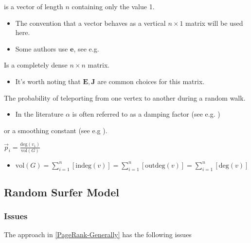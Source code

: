 \documentclass[11pt]{article}
\begin{document}
\begin{description}
\item[{\(\vec{1}\)}] is a vector of length \(n\) containing only the value 1.
\begin{itemize}
\item The convention that a vector behaves as a vertical \(n \times 1\) matrix will be used here.
\item Some authors use \(\mathbf{e}\), see e.g. \cite{langvilleGooglePageRankScience2012}
\end{itemize}
\item[{\(\mathbf{J} = \vec{1}\cdot \vec{1}^{\mathrm{T}} \iff \mathbf{J}_{i,j} = 1\)}] Is a completely dense \(n \times n\) matrix.
\begin{itemize}
\item It's worth noting that \(\mathbf{E}, \mathbf{J}\) are common choices for this matrix.
\end{itemize}
\item[{\(\alpha\)}] The probability of teleporting from one vertex to another during a random walk.
\begin{itemize}
\item In the literature \(\alpha\) is often referred to as a damping factor (see e.g.  \cite{berkhoutRankingNodesGeneral2018a,brinkmeierPageRankRevisited2006a,fuDampingFactorGoogle2006,kamvarAdaptiveMethodsComputation2004b,bianchiniPageRank2005})
\end{itemize}
or a smoothing constant (see e.g \cite{koppelMeasuringDirectIndirect2014}).
\item \(\vec{p}_{i} = \frac{\mathrm{deg}(v_{1})}{\mathrm{vol}(G)}\)
\begin{itemize}
\item \(\mathrm{vol}(G) = \sum^{n}_{i = 1} \left[ \mathrm{indeg}(v) \right] = \sum^{n}_{i = 1} \left[ \mathrm{outdeg}(v) \right ] = \sum^{n}_{i = 1} \left[ \mathrm{deg}(v) \right]\)
\end{itemize}
\end{description}

\subsection{Random Surfer Model}
\label{sec:orga18bc07}
\subsubsection{Issues}
\label{issues}
The approach in \ref{PageRank-Generally} has the following issues
\end{document}
